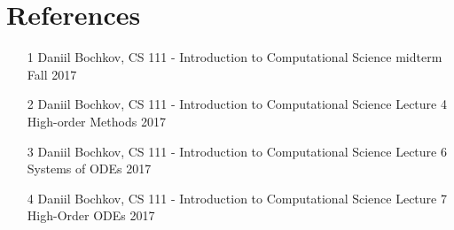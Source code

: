 \documentclass[12pt]{article}
\begin{document}
\newpage
\clearpage
\setcounter{page}{1} \pagestyle{empty}
\section{References}\label{sec::References}
\begin{itemize}
\item [1] Daniil Bochkov, CS 111 - Introduction to Computational Science midterm Fall 2017
\item [2] Daniil Bochkov, CS 111 - Introduction to Computational Science Lecture 4 High-order Methods 2017
\item [3] Daniil Bochkov, CS 111 - Introduction to Computational Science Lecture 6 Systems of ODEs 2017
\item [4] Daniil Bochkov, CS 111 - Introduction to Computational Science Lecture 7 High-Order ODEs 2017
\end{itemize}


\end{document}
